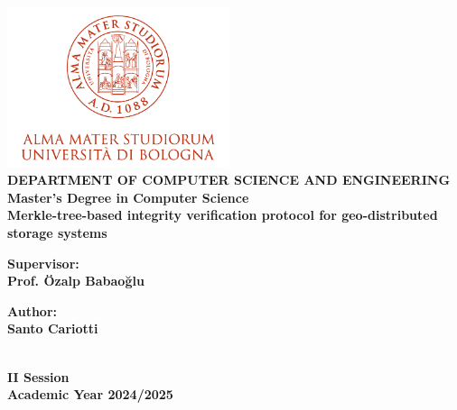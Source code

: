 
\begin{titlepage}
\begin{center}


\includegraphics[width=2.56in]{assets/logo.png}\\[1cm]

{\bfseries DEPARTMENT OF COMPUTER SCIENCE AND ENGINEERING \\ 
Master's Degree in Computer Science } \\[5cm]


{\LARGE \bfseries
Merkle-tree-based integrity verification protocol for geo-distributed storage systems\\[7cm]
}

\begin{minipage}[t]{0.47\textwidth}
\raggedright
{\large \bfseries Supervisor: \\ Prof. Özalp Babaoğlu}
\end{minipage}
\hfill
\begin{minipage}[t]{0.47\textwidth}
\raggedleft
{\large \bfseries Author: \\ Santo Cariotti}
\end{minipage} \\[3cm]

{\large \bfseries II Session \\ 
Academic Year 2024/2025}

\end{center}
\end{titlepage}

\restoregeometry

